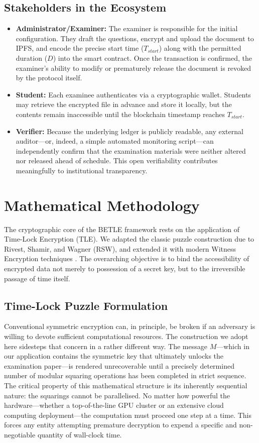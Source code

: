 \documentclass[final,5p,times]{elsarticle}
\begin{document}
\subsection{Stakeholders in the Ecosystem}
\begin{itemize}
    \item \textbf{Administrator/Examiner:} The examiner is responsible for the initial configuration. They draft the questions, encrypt and upload the document to IPFS, and encode the precise start time ($T_{start}$) along with the permitted duration ($D$) into the smart contract. Once the transaction is confirmed, the examiner's ability to modify or prematurely release the document is revoked by the protocol itself.
    \item \textbf{Student:} Each examinee authenticates via a cryptographic wallet. Students may retrieve the encrypted file in advance and store it locally, but the contents remain inaccessible until the blockchain timestamp reaches $T_{start}$.
    \item \textbf{Verifier:} Because the underlying ledger is publicly readable, any external auditor—or, indeed, a simple automated monitoring script—can independently confirm that the examination materials were neither altered nor released ahead of schedule. This open verifiability contributes meaningfully to institutional transparency.
\end{itemize}

\section{Mathematical Methodology}

The cryptographic core of the BETLE framework rests on the application of Time-Lock Encryption (TLE). We adapted the classic puzzle construction due to Rivest, Shamir, and Wagner (RSW), and extended it with modern Witness Encryption techniques \cite{tle}. The overarching objective is to bind the accessibility of encrypted data not merely to possession of a secret key, but to the irreversible passage of time itself.

\subsection{Time-Lock Puzzle Formulation}
Conventional symmetric encryption can, in principle, be broken if an adversary is willing to devote sufficient computational resources. The construction we adopt here sidesteps that concern in a rather different way. The message $M$—which in our application contains the symmetric key that ultimately unlocks the examination paper—is rendered unrecoverable until a precisely determined number of modular squaring operations has been completed in strict sequence. The critical property of this mathematical structure is its inherently sequential nature: the squarings cannot be parallelised. No matter how powerful the hardware—whether a top-of-the-line GPU cluster or an extensive cloud computing deployment—the computation must proceed one step at a time. This forces any entity attempting premature decryption to expend a specific and non-negotiable quantity of wall-clock time.
\end{document}
